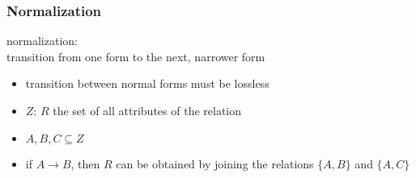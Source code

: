 \documentclass[dvipsnames]{beamer}
\begin{document}
\begin{frame}
  \frametitle{Normalization}

  \begin{definition}
    \alert{normalization}:\\
      transition from one form to the next, narrower form

    \begin{itemize}
      \item transition between normal forms must be lossless
    \end{itemize}
  \end{definition}

  \pause
  \begin{theorem}[Heath]
    \begin{itemize}
      \item $Z$: $R$ the set of all attributes of the relation
      \item $A,B,C \subseteq Z$

      \pause
      \item if $A \rightarrow B$, then $R$ can be obtained by joining
        the relations $\{A,B\}$ and $\{A,C\}$
    \end{itemize}
  \end{theorem}
\end{frame}
\end{document}
